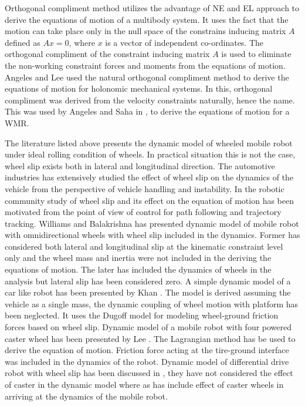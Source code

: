Orthogonal compliment method utilizes the advantage of NE and EL approach to derive the equations of motion of  a multibody  system.  It uses the fact that the motion can take place only in the null space of the constrains inducing matrix $A$ defined as $Ax=0$, where $x$ is a vector of independent co-ordinates. The orthogonal compliment of the constraint inducing matrix $A$ is used to eliminate the non-working constraint  forces  and moments from the equations of motion.  Angeles and Lee \cite{angeles1988formulation} used the natural orthogonal compliment method to derive the equations of motion for holonomic mechanical systems. In this,  orthogonal compliment was derived from the velocity constraints naturally, hence the name. This was  used by Angeles \cite{angeles2013fundamentals} and Saha in \cite{saha1989kinematics},\cite{saha1991dynamics} to derive the equations of motion for a WMR. 

  The literature listed above presents the dynamic model of wheeled mobile robot under ideal rolling condition of wheels. In practical situation this is not the case,  wheel slip exists both in lateral and longitudinal direction. The automotive industries  has extensively studied the effect of wheel slip on the dynamics of the vehicle from the perspective of vehicle handling and instability. In the robotic community study of wheel slip and its effect on the equation of motion has been motivated from the point of view of control for path following  and trajectory tracking.  Williams\cite{williams2002dynamic}  and Balakrishna  \cite{balakrishna1995modeling} has presented dynamic model of mobile robot with omnidirectional wheels with wheel slip included in the dynamics. Former has considered both lateral and longitudinal slip at the kinematic  constraint level only and  the wheel mass and inertia were not included in the deriving the equations of motion. The later has included the dynamics of  wheels in the analysis but lateral slip  has been considered zero. A simple dynamic model of a car like robot has been presented by Khan \cite{khan2015longitudinal}. The model is derived assuming the  vehicle as a single mass, the dynamic coupling of wheel motion with platform has been neglected. It uses the  Dugoff model \cite{dakhlallah2008tire} for modeling wheel-ground friction forces based on wheel slip. Dynamic model of a mobile robot with four powered caster wheel has been presented by Lee \cite{liu2010dynamic}. The Lagrangian method has be used to derive the equation of motion. Friction force acting at the tire-ground interface was included in the dynamics of the robot.  Dynamic model of differential drive robot with wheel slip has been discussed in \cite{tian2009modeling},\cite{sidek2008dynamic}  they have not considered the effect of caster in the dynamic model where as \cite{konduri2014effect} has include effect of caster wheels in arriving at the dynamics of the mobile robot.
  
